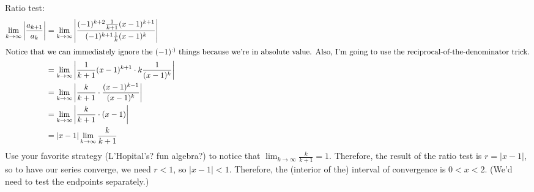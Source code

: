 \documentclass[10pt]{article}
\newenvironment{red}{\color{red}}{\ignorespacesafterend}
\begin{document}
\begin{enumerate}[leftmargin=0pt]
\begin{enumerate}
    \begin{red}
    Ratio test:
    \begin{align*}
        \lim_{k\to\infty} \left| \dfrac{a_{k+1}}{a_k} \right| &= 
        \lim_{k\to\infty} \left| \dfrac{(-1)^{k+2} \frac{1}{k+1} (x-1)^{k+1}}{(-1)^{k+1} \frac{1}{k} (x-1)^k} \right| \\
        \intertext{Notice that we can immediately ignore the $(-1)^\text{:)}$ things because we're in absolute value. Also, I'm going to use the reciprocal-of-the-denominator trick.}
        &= \lim_{k\to\infty} \left| \frac{1}{k+1} (x-1)^{k+1} \cdot k\frac{1}{(x-1)^k}  \right| \\
        &= \lim_{k\to\infty} \left| \frac{k}{k+1} \cdot \frac{(x-1)^{k-1}}{(x-1)^k} \right| \\
        &= \lim_{k\to\infty} \left| \frac{k}{k+1} \cdot (x-1) \right| \\
        &= |x-1|\lim_{k\to\infty} \frac{k}{k+1}
    \end{align*}
    Use your favorite strategy (L'Hopital's? fun algebra?) to notice that $\lim_{k\to\infty} \frac{k}{k+1} = 1$. Therefore, the result of the ratio test is $r = |x-1|$, so to have our series converge, we need $r < 1$, so $|x-1| < 1$. Therefore, the (interior of the) interval of convergence is $0 < x < 2$. (We'd need to test the endpoints separately.)
    \end{red}
\end{enumerate}


\end{enumerate}
\end{document}
